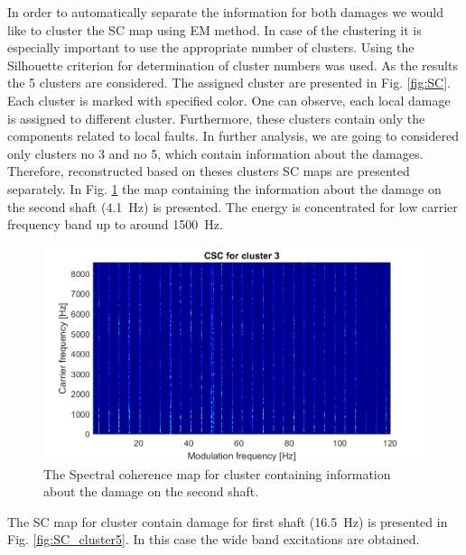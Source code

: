 \documentclass[11pt]{article}
\begin{document}
%
In order to automatically separate the information for both damages we would like to cluster the SC map using EM method. In case of the clustering it is especially important to use the appropriate number of clusters. Using the Silhouette criterion for determination of cluster numbers was used. As the results the 5 clusters are considered. The assigned cluster are presented in Fig. \ref{fig:SC}. Each cluster is marked with specified color. One can observe, each local damage is assigned to different cluster. Furthermore, these clusters contain only the components related to local faults. 
In further analysis, we are going to considered only clusters no 3 and no 5, which contain information about the damages. 
Therefore, reconstructed based on theses clusters SC maps are presented separately. In Fig. \ref{fig: SC_cluster3} the map containing the information about the damage on the second shaft (4.1~Hz) is presented. The energy is concentrated for low carrier frequency band up to around 1500~Hz.
%
\begin{figure}[h!]
\begin{center}
\includegraphics[width=\textwidth]{wykresy/212_SC_cluster_3.png}
\caption{The Spectral coherence map for cluster containing information about the damage on the second shaft.}
\label{fig: SC_cluster3}
\end{center}
\end{figure}
%
The SC map for cluster contain damage for first shaft (16.5~Hz) is presented in Fig. \ref{fig:SC_cluster5}. In this case the wide band excitations are obtained. 
\end{document}
